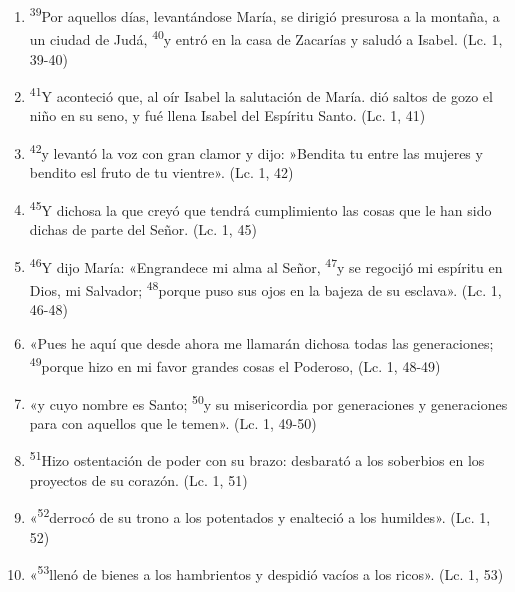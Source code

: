 \documentclass[a4paper,11pt]{article}
\begin{document}
      \begin{enumerate}
        
        \item \textsuperscript{39}Por aquellos días, levantándose María, se dirigió presurosa a la montaña, a un ciudad de Judá, \textsuperscript{40}y entró en la casa
        de Zacarías y saludó a Isabel. (Lc. 1, 39-40)
        
        \item \textsuperscript{41}Y aconteció que, al oír Isabel la salutación de María. dió saltos de gozo el niño en su seno, y fué llena Isabel del Espíritu Santo. (Lc. 1, 41)
        
        \item \textsuperscript{42}y levantó la voz con gran clamor y dijo: »Bendita tu entre las mujeres y bendito esl fruto de tu vientre». (Lc. 1, 42)
        
        \item \textsuperscript{45}Y dichosa la que creyó que tendrá cumplimiento las cosas que le han sido dichas de parte del Señor. (Lc. 1, 45)
        
        \item \textsuperscript{46}Y dijo María: «Engrandece mi alma al Señor, \textsuperscript{47}y se regocijó mi espíritu en Dios, mi Salvador;
        \textsuperscript{48}porque puso sus ojos en la bajeza de su esclava». (Lc. 1, 46-48)

        \item «Pues he aquí que desde ahora me llamarán dichosa todas las generaciones; 
        \textsuperscript{49}porque hizo en mi favor grandes cosas el Poderoso, (Lc. 1, 48-49)
        
        \item «y cuyo nombre es Santo; \textsuperscript{50}y su misericordia por generaciones y generaciones para con aquellos que le temen». (Lc. 1, 49-50)
        
        \item \textsuperscript{51}Hizo ostentación de poder con su brazo: desbarató a los soberbios en los proyectos de su corazón. (Lc. 1, 51)
        
        \item «\textsuperscript{52}derrocó de su trono a los potentados y enalteció a los humildes». (Lc. 1, 52)
        
        \item «\textsuperscript{53}llenó de bienes a los hambrientos y despidió vacíos a los ricos». (Lc. 1, 53)

      \end{enumerate}
            
\end{document}
